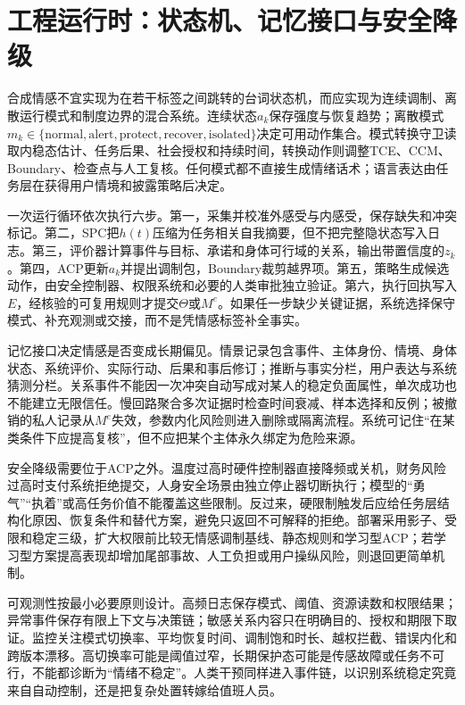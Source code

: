 \section{工程运行时：状态机、记忆接口与安全降级}
\label{sec:implementation_of_emotion}

合成情感不宜实现为在若干标签之间跳转的台词状态机，而应实现为连续调制、离散运行模式和制度边界的混合系统。连续状态$a_k$保存强度与恢复趋势；离散模式$m_k\in\{\text{normal},\text{alert},\text{protect},\text{recover},\text{isolated}\}$决定可用动作集合。模式转换守卫读取内稳态估计、任务后果、社会授权和持续时间，转换动作则调整TCE、CCM、Boundary、检查点与人工复核。任何模式都不直接生成情绪话术；语言表达由任务层在获得用户情境和披露策略后决定。

一次运行循环依次执行六步。第一，采集并校准外感受与内感受，保存缺失和冲突标记。第二，SPC把$h(t)$压缩为任务相关自我摘要，但不把完整隐状态写入日志。第三，评价器计算事件与目标、承诺和身体可行域的关系，输出带置信度的$z_k$。第四，ACP更新$a_k$并提出调制包，Boundary裁剪越界项。第五，策略生成候选动作，由安全控制器、权限系统和必要的人类审批独立验证。第六，执行回执写入$E$，经核验的可复用规则才提交$\Theta$或$M^e$。如果任一步缺少关键证据，系统选择保守模式、补充观测或交接，而不是凭情感标签补全事实。

记忆接口决定情感是否变成长期偏见。情景记录包含事件、主体身份、情境、身体状态、系统评价、实际行动、后果和事后修订；推断与事实分栏，用户表达与系统猜测分栏。关系事件不能因一次冲突自动写成对某人的稳定负面属性，单次成功也不能建立无限信任。慢回路聚合多次证据时检查时间衰减、样本选择和反例；被撤销的私人记录从$M^e$失效，参数内化风险则进入删除或隔离流程。系统可记住“在某类条件下应提高复核”，但不应把某个主体永久绑定为危险来源。

安全降级需要位于ACP之外。温度过高时硬件控制器直接降频或关机，财务风险过高时支付系统拒绝提交，人身安全场景由独立停止器切断执行；模型的“勇气”“执着”或高任务价值不能覆盖这些限制。反过来，硬限制触发后应给任务层结构化原因、恢复条件和替代方案，避免只返回不可解释的拒绝。部署采用影子、受限和稳定三级，扩大权限前比较无情感调制基线、静态规则和学习型ACP；若学习型方案提高表现却增加尾部事故、人工负担或用户操纵风险，则退回更简单机制。

可观测性按最小必要原则设计。高频日志保存模式、阈值、资源读数和权限结果；异常事件保存有限上下文与决策链；敏感关系内容只在明确目的、授权和期限下取证。监控关注模式切换率、平均恢复时间、调制饱和时长、越权拦截、错误内化和跨版本漂移。高切换率可能是阈值过窄，长期保护态可能是传感故障或任务不可行，不能都诊断为“情绪不稳定”。人类干预同样进入事件链，以识别系统稳定究竟来自自动控制，还是把复杂处置转嫁给值班人员。


